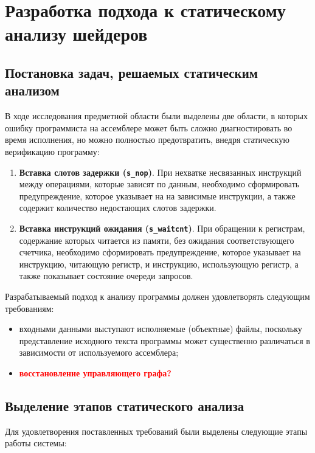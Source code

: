 \documentclass[a4paper,14pt]{extarticle}
\newcommand{\todo}[1]{\textbf{\textcolor{red}{#1}}}
\newenvironment{ul}{\begin{itemize}[noitemsep,topsep=0em]}{\end{itemize}\vspace{4mm}}
\newenvironment{ol}{\begin{enumerate}[noitemsep,topsep=0em]}{\end{enumerate}\vspace{4mm}}
\begin{document}
\section{Разработка подхода к статическому анализу шейдеров}

\subsection{Постановка задач, решаемых статическим анализом}

В ходе исследования предметной области были выделены две области, в которых ошибку программиста
на ассемблере может быть сложно диагностировать во время исполнения, но можно полностью
предотвратить, внедря статическую верификацию программу:
\begin{ol}
\item \textbf{Вставка слотов задержки (\texttt{s\_nop})}. При нехватке несвязанных инструкций между операциями, которые зависят по данным, необходимо сформировать предупреждение, которое указывает на
на зависимые инструкции, а также содержит количество недостающих слотов задержки.
\item \textbf{Вставка инструкций ожидания (\texttt{s\_waitcnt})}. При обращении к регистрам, содержание которых читается из памяти, без ожидания соответствующего счетчика, необходимо сформировать предупреждение, которое указывает на инструкцию, читающую регистр, и инструкцию, использующую регистр, а также показывает состояние очереди запросов.
\end{ol}

Разрабатываемый подход к анализу программы должен удовлетворять следующим требованиям:

\begin{ul}
\item входными данными выступают исполняемые (объектные) файлы, поскольку представление исходного текста программы может существенно различаться в зависимости от используемого ассемблера;
\item \todo{восстановление управляющего графа?}
\end{ul}

\subsection{Выделение этапов статического анализа}

Для удовлетворения поставленных требований были выделены следующие этапы работы системы:\\
\end{document}

